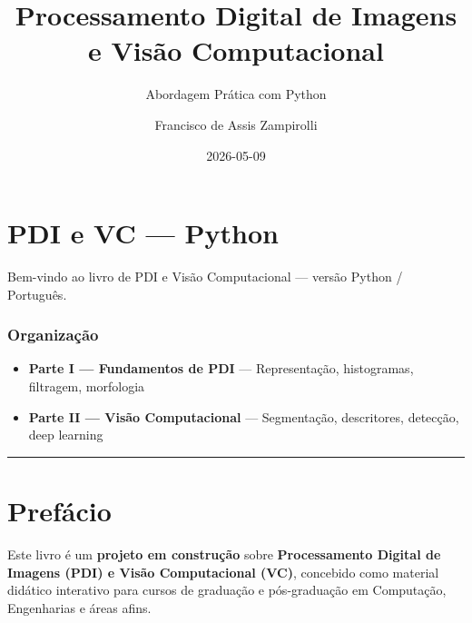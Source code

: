 \documentclass[
  portuguese,
  letterpaper,
  openany,
  oneside,
  12pt,
  a4paper]{book}
\title{Processamento Digital de Imagens e Visão Computacional}
\subtitle{Abordagem Prática com Python}
\author{Francisco de Assis Zampirolli}
\date{2026-05-09}
\providecommand{\tightlist}{%
  \setlength{\itemsep}{0pt}\setlength{\parskip}{0pt}}
\renewcommand*\contentsname{Índice}
\newcommand\contentsname{Índice}
\begin{document}
\frontmatter
\maketitle

\renewcommand*\contentsname{Índice}
{
\hypersetup{linkcolor=}
\setcounter{tocdepth}{2}
\tableofcontents
}

\mainmatter
{}

\chapter*{PDI e VC --- Python}\label{pdi-e-vc-python}


Bem-vindo ao livro de PDI e Visão Computacional --- versão Python /
Português.

\subsection*{Organização}\label{organizauxe7uxe3o}

\begin{itemize}
\tightlist
\item
  \textbf{Parte I --- Fundamentos de PDI} --- Representação,
  histogramas, filtragem, morfologia
\item
  \textbf{Parte II --- Visão Computacional} --- Segmentação,
  descritores, detecção, deep learning
\end{itemize}

\begin{center}\rule{0.5\linewidth}{0.5pt}\end{center}


\chapter*{Prefácio}\label{prefuxe1cio}


Este livro é um \textbf{projeto em construção} sobre
\textbf{Processamento Digital de Imagens (PDI) e Visão Computacional
(VC)}, concebido como material didático interativo para cursos de
graduação e pós-graduação em Computação, Engenharias e áreas afins.
\end{document}
